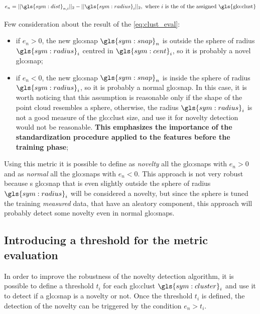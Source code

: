 \begin{equation}
  \label{eq:clust_eval}
  e_{n} = ||\gls{sym:dist}_{n,i}||_2 - ||\gls{sym:radius}_{i}||_2, \text{ where $i$ is the of the assigned \gls{glo:clust}}
\end{equation}

Few consideration about the result of the \autoref{eq:clust_eval}:
\begin{itemize}
  \item if $e_{n} > 0$, the new {\gls{glo:snap}} $\gls{sym:snap}_n$ is outside the sphere of radius $\gls{sym:radius}_i$ centred in $\gls{sym:cent}_i$, so it is probably a novel {\gls{glo:snap}};
  \item if $e_{n} < 0$, the new {\gls{glo:snap}} $\gls{sym:snap}_n$ is inside the sphere of radius $\gls{sym:radius}_i$, so it is probably a normal {\gls{glo:snap}}. In this case, it is worth noticing that this assumption is reasonable only if the shape of the point cloud resembles a sphere, otherwise, the radius $\gls{sym:radius}_i$ is not a good measure of the \gls{glo:clust} size, and use it for novelty detection would not be reasonable. \textbf{This emphasizes the importance of the standardization procedure applied to the features before the training phase};
\end{itemize}



Using this metric it is possible to define as \emph{novelty} all the {\gls{glo:snap}}s with $e_{n} > 0$ and as \emph{normal} all the {\gls{glo:snap}}s with $e_{n} < 0$. This approach is not very robust because s {\gls{glo:snap}} that is even slightly outside the sphere of radius $\gls{sym:radius}_i$ will be considered a novelty, but since the sphere is tuned the training \emph{measured} data, that have an aleatory component, this approach will probably detect some novelty even in normal {\gls{glo:snap}}s.

\subsection{Introducing a threshold for the metric evaluation}
\label{sec:clust_threshold}
In order to improve the robustness of the novelty detection algorithm, it is possible to define a threshold ${t}_i$ for each \gls{glo:clust} $\gls{sym:cluster}_i$ and use it to detect if a {\gls{glo:snap}} is a novelty or not. Once the threshold ${t}_i$ is defined, the detection of the novelty can be triggered by the condition $e_{n} > {t}_i$.

